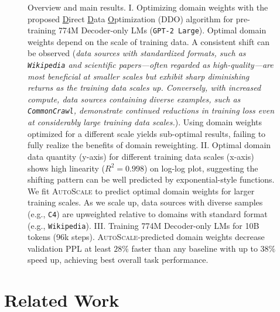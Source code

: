 \documentclass{article} %
\begin{document}
\begin{figure}[h!]
\begin{center}
  \caption{\small{Overview and main results. I. Optimizing domain weights with the proposed \underline{D}irect \underline{D}ata \underline{O}ptimization (\textsc{DDO}) algorithm for pre-training 774M Decoder-only LMs (\texttt{GPT-2 Large}). Optimal domain weights depend on the scale of training data. A consistent shift can be observed (\textit{data sources with standardized formats, such as \texttt{Wikipedia} and scientific papers---often regarded as high-quality---are most beneficial at smaller scales but exhibit sharp diminishing returns as the training data scales up. Conversely, with increased compute, data sources containing diverse examples, such as \texttt{CommonCrawl}, demonstrate continued reductions in training loss even at considerably large training data scales.}). Using domain weights optimized for a different scale yields sub-optimal results, failing to fully realize the benefits of domain reweighting. II. Optimal domain data quantity (y-axis) for different training data scales (x-axis) shows high linearity ($R^2=0.998$) on log-log plot, suggesting the shifting pattern can be well predicted by exponential-style functions. We fit \textsc{AutoScale} to predict optimal domain weights for larger training scales. As we scale up, data sources with diverse samples (e.g., \texttt{C4}) are upweighted relative to domains with standard format (e.g., \texttt{Wikipedia}). III. Training 774M Decoder-only LMs for 10B tokens (96k steps). \textsc{AutoScale}-predicted domain weights decrease validation PPL at least $28\%$ faster than any baseline with up to $38\%$ speed up, achieving best overall task performance. }\normalsize\vspace{-2em}
  }\label{fig:example1}
  \end{center}
\end{figure}%


\vspace{-0.5em}
\section{Related Work}
\end{document}
